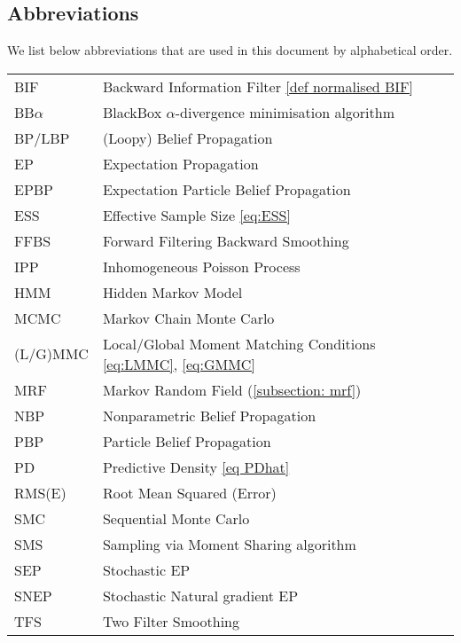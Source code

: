 \subsection*{Abbreviations}
We list below abbreviations that are used in this document by alphabetical order. 
\setlength{\tabcolsep}{12pt}
\renewcommand{\arraystretch}{1.2}
\begin{longtable}{ll}
BIF 			& Backward Information Filter \eqref{def normalised BIF}\\
BB$\alpha$	& BlackBox $\alpha$-divergence minimisation algorithm\\
BP/LBP 		& (Loopy) Belief Propagation\\
EP	 		& Expectation Propagation\\
EPBP 		& Expectation Particle Belief Propagation\\
ESS 			& Effective Sample Size \eqref{eq:ESS}\\
FFBS 		& Forward Filtering Backward Smoothing \\
IPP 			& Inhomogeneous Poisson Process\\
HMM 		& Hidden Markov Model\\
MCMC 		& Markov Chain Monte Carlo\\
(L/G)MMC	& Local/Global Moment Matching Conditions \eqref{eq:LMMC}, \eqref{eq:GMMC}\\
MRF 		& Markov Random Field (\ref{subsection: mrf})\\
NBP 			& Nonparametric Belief Propagation\\
PBP	 		& Particle Belief Propagation\\
PD 			& Predictive Density \eqref{eq PDhat}\\
RMS(E) 		& Root Mean Squared (Error)\\
SMC 		& Sequential Monte Carlo\\
SMS 		& Sampling via Moment Sharing algorithm\\
SEP 		& Stochastic EP\\
SNEP		& Stochastic Natural gradient EP\\
TFS 		& Two Filter Smoothing\\ 
\end{longtable}
\setlength{\tabcolsep}{6pt} %
\newpage
